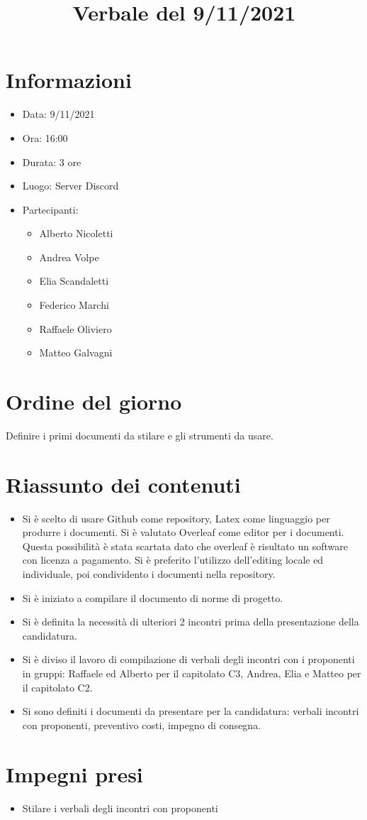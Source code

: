 \documentclass[a4paper,12pt]{article}
\author{}
\date{}
\begin{document}

\title{Verbale del 9/11/2021}
\maketitle

\section{Informazioni}

\begin{itemize}
\item Data: 9/11/2021
\item Ora: 16:00
\item Durata: 3 ore
\item Luogo: Server Discord
\item Partecipanti: 
\begin{itemize}
\item Alberto Nicoletti
\item Andrea Volpe
\item Elia Scandaletti
\item Federico Marchi
\item Raffaele Oliviero
\item Matteo Galvagni
\end{itemize}
\end{itemize}

\section{Ordine del giorno}
Definire i primi documenti da stilare e gli strumenti da usare.

\section{Riassunto dei contenuti}

\begin{itemize}
\item Si è scelto di usare Github come repository, Latex come linguaggio per produrre i documenti. Si è valutato Overleaf come editor per i documenti. Questa possibilità è stata scartata dato che overleaf è risultato un software con licenza a pagamento. Si è preferito l'utilizzo dell'editing locale ed individuale, poi condividento i documenti nella repository.
\item Si è iniziato a compilare il documento di norme di progetto.
\item Si è definita la necessità di ulteriori 2 incontri prima della presentazione della candidatura.
\item Si è diviso il lavoro di compilazione di verbali degli incontri con i proponenti in gruppi: Raffaele ed Alberto per il capitolato C3, Andrea, Elia e Matteo per il capitolato C2.
\item Si sono definiti i documenti da presentare per la candidatura: verbali incontri con proponenti, preventivo costi, impegno di consegna.
\end{itemize}

\section{Impegni presi}
\begin{itemize}
\item{Stilare i verbali degli incontri con proponenti}
\end{itemize}
\end{document}
